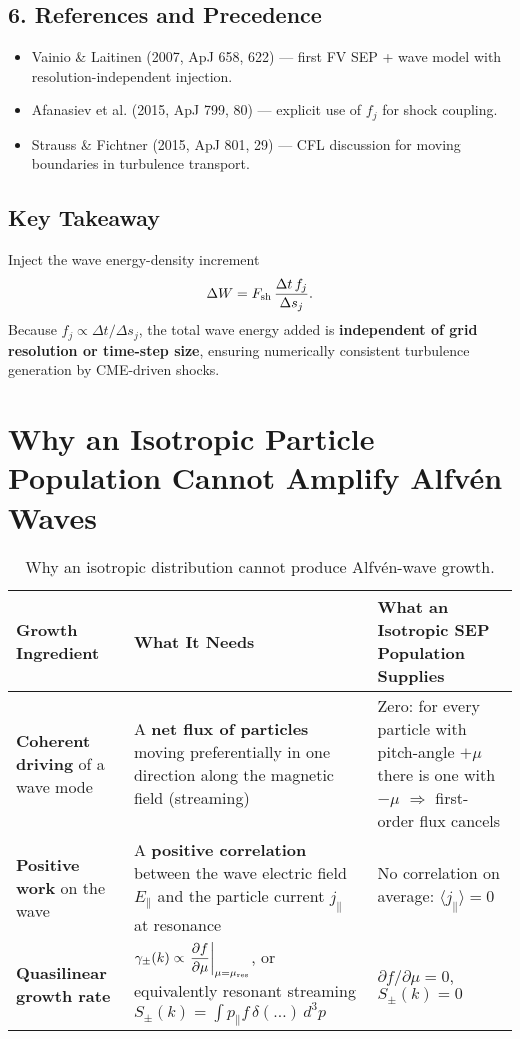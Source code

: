 \subsection*{6. References and Precedence}

\begin{itemize}
  \item Vainio \& Laitinen (2007, ApJ 658, 622) — first FV SEP + wave model with resolution-independent injection.
  \item Afanasiev et al. (2015, ApJ 799, 80) — explicit use of $f_j$ for shock coupling.
  \item Strauss \& Fichtner (2015, ApJ 801, 29) — CFL discussion for moving boundaries in turbulence transport.
\end{itemize}

\subsection*{Key Takeaway}

Inject the wave energy-density increment
\[
\Delta W = F_{\rm sh}\,\frac{\Delta t\,f_j}{\Delta s_j}.
\]
Because $f_j \propto \Delta t / \Delta s_j$, the total wave energy added is \textbf{independent of grid resolution or time-step size}, ensuring numerically consistent turbulence generation by CME-driven shocks.

\section*{Why an Isotropic Particle Population Cannot Amplify Alfvén Waves}

\begin{table}[H]
\centering
\renewcommand{\arraystretch}{1.4}
\begin{tabularx}{\textwidth}{|X|X|X|}
\hline
\textbf{Growth Ingredient} & \textbf{What It Needs} & \textbf{What an Isotropic SEP Population Supplies} \\
\hline
\textbf{Coherent driving} of a wave mode & A \textbf{net flux of particles} moving preferentially in one direction along the magnetic field (streaming) & Zero: for every particle with pitch-angle $+\mu$ there is one with $-\mu$ $\Rightarrow$ first-order flux cancels \\
\hline
\textbf{Positive work} on the wave & A \textbf{positive correlation} between the wave electric field $E_\parallel$ and the particle current $j_\parallel$ at resonance & No correlation on average: $\langle j_\parallel \rangle = 0$ \\
\hline
\textbf{Quasilinear growth rate} & $\displaystyle \gamma_\pm(k) \propto \left.\frac{\partial f}{\partial \mu}\right|_{\mu = \mu_{\rm res}}$, or equivalently resonant streaming $S_\pm(k) = \int p_\parallel f\,\delta(\dots)\,d^3p$ & $\partial f/\partial\mu = 0$, $S_\pm(k) = 0$ \\
\hline
\end{tabularx}
\caption{Why an isotropic distribution cannot produce Alfvén-wave growth.}
\end{table}

